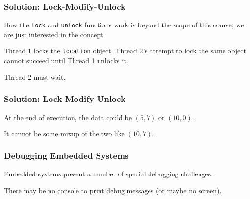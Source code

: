 \begin{frame}
\frametitle{Solution: Lock-Modify-Unlock}
\begin{changemargin}{1cm}

How the \texttt{lock} and \texttt{unlock} functions work is beyond the scope of this course; we are just interested in the concept.

Thread 1 locks the \texttt{location} object. Thread 2's attempt to lock the same object cannot succeed until Thread 1 unlocks it.

Thread 2 must wait.

\end{changemargin}
\end{frame}

\begin{frame}
\frametitle{Solution: Lock-Modify-Unlock}
\begin{changemargin}{1cm}

At the end of execution, the data could be $(5,7)$ or $(10,0)$.

It cannot be some mixup of the two like $(10, 7)$. 

\end{changemargin}
\end{frame}

\begin{frame}
\frametitle{Debugging Embedded Systems}
\begin{changemargin}{1cm}

Embedded systems present a number of special debugging challenges.

There may be no console to print debug messages (or maybe no screen).


\end{changemargin}
\end{frame}

